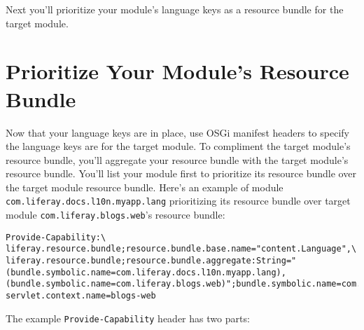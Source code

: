 Next you'll prioritize your module's language keys as a resource bundle
for the target module.

\section{Prioritize Your Module's Resource
Bundle}\label{prioritize-your-modules-resource-bundle}

Now that your language keys are in place, use OSGi manifest headers to
specify the language keys are for the target module. To compliment the
target module's resource bundle, you'll aggregate your resource bundle
with the target module's resource bundle. You'll list your module first
to prioritize its resource bundle over the target module resource
bundle. Here's an example of module
\texttt{com.liferay.docs.l10n.myapp.lang} prioritizing its resource
bundle over target module \texttt{com.liferay.blogs.web}'s resource
bundle:

\begin{verbatim}
Provide-Capability:\
liferay.resource.bundle;resource.bundle.base.name="content.Language",\
liferay.resource.bundle;resource.bundle.aggregate:String="(bundle.symbolic.name=com.liferay.docs.l10n.myapp.lang),(bundle.symbolic.name=com.liferay.blogs.web)";bundle.symbolic.name=com.liferay.blogs.web;resource.bundle.base.name="content.Language";service.ranking:Long="2";\
servlet.context.name=blogs-web
\end{verbatim}

The example \texttt{Provide-Capability} header has two parts:

